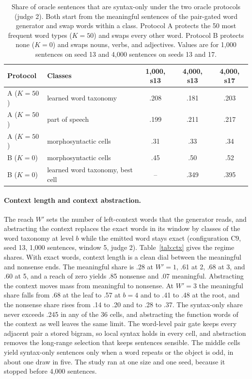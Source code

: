 \documentclass[11pt,letterpaper]{article}
\begin{document}
\begin{table}[h]
\caption{Share of oracle sentences that are syntax-only under the two oracle protocols (judge 2). Both start from the meaningful sentences of the pair-gated word generator and swap words within a class.
Protocol A protects the 50 most frequent word types ($K=50$) and swaps every other word. Protocol B protects none ($K=0$) and swaps nouns, verbs, and adjectives.
Values are for 1,000 sentences on seed 13 and 4,000 sentences on seeds 13 and 17.}
\label{tab:oracle}
\begin{center}
\small
\begin{tabular}{llccc}
\toprule
Protocol & Classes & 1,000, s13 & 4,000, s13 & 4,000, s17 \\
\midrule
A ($K=50$) & learned word taxonomy & .208 & .181 & .203 \\
A ($K=50$) & part of speech & .199 & .211 & .217 \\
A ($K=50$) & morphosyntactic cells & .31 & .33 & .34 \\
B ($K=0$) & morphosyntactic cells & .45 & .50 & .52 \\
B ($K=0$) & learned word taxonomy, best cell & -- & .349 & .395 \\
\bottomrule
\end{tabular}
\end{center}
\end{table}

\paragraph{Context length and context abstraction.} The reach $W'$ sets the number of left-context words that the generator reads, and abstracting the context replaces the exact words in its window by classes of the word taxonomy at level $b$ while the emitted word stays exact (configuration C9, seed 13, 1,000 sentences, window 5, judge 2).
Table~\ref{tab:ctx} gives the regime shares. With exact words, context length is a clean dial between the meaningful and nonsense ends. The meaningful share is .28 at $W'=1$, .61 at 2, .68 at 3, and .60 at 5, and a reach of zero yields .85 nonsense and .07 meaningful.
Abstracting the context moves mass from meaningful to nonsense. At $W'=3$ the meaningful share falls from .68 at the leaf to .57 at $b=4$ and to .41 to .48 at the root, and the nonsense share rises from .14 to .20 and to .28 to .37.
The syntax-only share never exceeds .245 in any of the 36 cells, and abstracting the function words of the context as well leaves the same limit. The word-level pair gate keeps every adjacent pair a stored bigram, so local syntax holds in every cell, and abstraction removes the long-range selection that keeps sentences sensible.
The middle cells yield syntax-only sentences only when a word repeats or the object is odd, in about one draw in five. The study ran at one size and one seed, because it stopped before 4,000 sentences.
\end{document}
